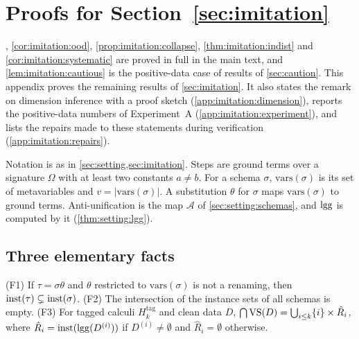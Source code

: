 \providecommand{\vars}{\mathrm{vars}}
\providecommand{\rt}{\mathrm{root}}
\providecommand{\Sub}{\mathrm{Sub}}
\providecommand{\Acc}{\mathrm{Acc}}
\providecommand{\Fail}{\mathfrak F}

\section{Proofs for Section~\ref{sec:imitation}}\label{app:imitation}

, \cref{cor:imitation:ood}, \cref{prop:imitation:collapse}, \cref{thm:imitation:indist} and \cref{cor:imitation:systematic} are proved in full in the main text, and \cref{lem:imitation:cautious} is the positive-data case of results of \cref{sec:caution}. This appendix proves the remaining results of \cref{sec:imitation}. It also states the remark on dimension inference with a proof sketch (\cref{app:imitation:dimension}), reports the positive-data numbers of Experiment~A (\cref{app:imitation:experiment}), and lists the repairs made to these statements during verification (\cref{app:imitation:repairs}).

Notation is as in \cref{sec:setting,sec:imitation}. Steps are ground terms over a signature $\Omega$ with at least two constants $a\neq b$. For a schema $\sigma$, $\vars(\sigma)$ is its set of metavariables and $v=|\vars(\sigma)|$. A substitution $\theta$ for $\sigma$ maps $\vars(\sigma)$ to ground terms. Anti-unification is the map $\mathcal A$ of \cref{sec:setting:schemas}, and $\mathrm{lgg}$ is computed by it (\cref{thm:setting:lgg}).

\subsection{Three elementary facts}\label{app:imitation:facts}

\begin{lemma}\label{lem:app:imitation:facts}
\textup{(F1)} If $\tau=\sigma\theta$ and $\theta$ restricted to $\vars(\sigma)$ is not a renaming, then $\mathrm{inst}(\tau)\subsetneq\mathrm{inst}(\sigma)$.
\textup{(F2)} The intersection of the instance sets of all schemas is empty.
\textup{(F3)} For tagged calculi $H^{\mathrm{tag}}_k$ and clean data $D$, $\bigcap\mathrm{VS}(D)=\bigcup_{i\le k}\{i\}\times\hat R_i$, where $\hat R_i=\mathrm{inst}(\mathrm{lgg}(D^{(i)}))$ if $D^{(i)}\neq\emptyset$ and $\hat R_i=\emptyset$ otherwise.
\end{lemma}

